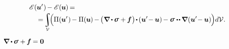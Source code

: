 \nopagebreak\vspace{-0.1em}\begin{equation*}
\begin{multlined}[\displaywidth]
\potentialenergyfunctional \hspace{.16ex} (\hspace{-0.1ex}\bm{u}'\hspace{.1ex}) \hspace{-0.2ex} -
\potentialenergyfunctional \hspace{.16ex} (\hspace{-0.1ex}\bm{u}\hspace{-0.1ex}) \hspace{-0.2ex}
=
\\[-0.1em]
%
= \hspace{-0.3ex}
\scalebox{0.9}{$\displaystyle\integral\displaylimits_{\mathcal{V}}$} \hspace{-0.44ex}
\Bigl(
\potential(\hspace{-0.1ex}\bm{u}'\hspace{.1ex}) \hspace{-0.2ex}
- \potential(\hspace{-0.1ex}\bm{u}\hspace{-0.1ex}) \hspace{-0.2ex}
- \hspace{-0.2ex} \bigl( \hspace{.1ex} \boldnabla \hspace{-0.1ex} \dotp \hspace{-0.1ex} \linearstress + \hspace{-0.1ex} \bm{f} \hspace{.1ex} \bigr) \hspace{-0.3ex} \dotp \hspace{-0.2ex} ( \bm{u}' \hspace{-0.4ex} - \hspace{-0.1ex} \bm{u} ) \hspace{-0.2ex}
- \linearstress \dotdotp \hspace{-0.1ex} \boldnabla \hspace{.1ex} ( \bm{u}' \hspace{-0.4ex} - \hspace{-0.1ex} \bm{u} ) \hspace{-0.1ex}
\Bigr) d\mathcal{V}
.
\end{multlined}
\end{equation*}

\noindent
{}  ${\hspace{-0.24ex}\boldnabla \hspace{-0.1ex} \dotp \hspace{-0.1ex} \linearstress + \hspace{-0.1ex} \bm{f} \hspace{-0.15ex} = \bm{0}}$


